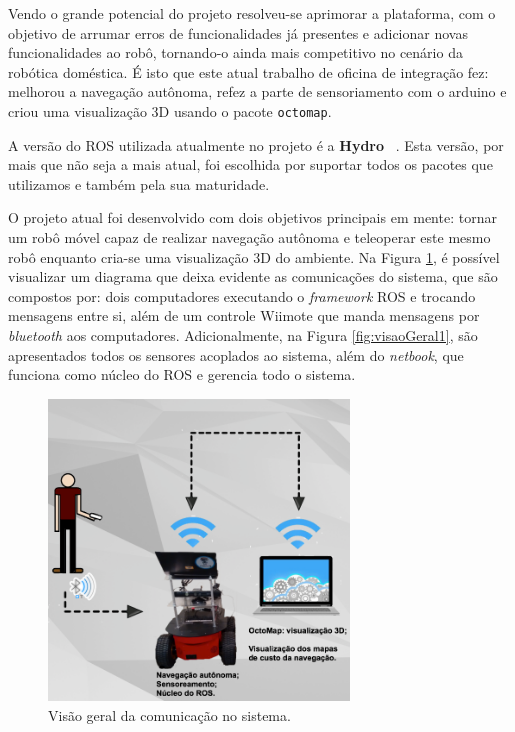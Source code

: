 Vendo o grande potencial do projeto resolveu-se aprimorar a plataforma, com o objetivo de arrumar erros de funcionalidades já presentes e adicionar novas funcionalidades ao robô, tornando-o ainda mais competitivo no cenário da robótica doméstica. É isto que este atual trabalho de oficina de integração fez: melhorou a navegação autônoma, refez a parte de sensoriamento com o arduino e criou uma visualização 3D usando o pacote \verb|octomap|.


A versão do ROS utilizada atualmente no projeto é a \textbf{Hydro} ~\cite{rosHydro}. Esta versão, por mais que não seja a mais atual, foi escolhida por suportar todos os pacotes que utilizamos e também pela sua maturidade.

O projeto atual foi desenvolvido com dois objetivos principais em mente: tornar um robô móvel capaz de realizar navegação autônoma e teleoperar este mesmo robô enquanto cria-se uma visualização 3D do ambiente. Na Figura \ref{fig:visaoGeral0}, é possível visualizar um diagrama que deixa evidente as comunicações do sistema, que são compostos por: dois computadores executando o \textit{framework} ROS e trocando mensagens entre si, além de um controle Wiimote que manda mensagens por \textit{bluetooth} aos computadores. Adicionalmente, na Figura \ref{fig:visaoGeral1}, são apresentados todos os sensores acoplados ao sistema, além do \textit{netbook}, que funciona como núcleo do ROS e gerencia todo o sistema.

\begin{figure}[H]
\centering
  \includegraphics[width=8cm]{images/visaoGeral0.png}
\caption{\small{Visão geral da comunicação no sistema.}}
\label{fig:visaoGeral0}
\end{figure} 

